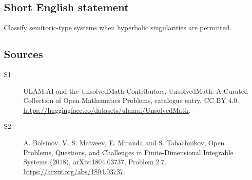 \documentclass[11pt]{article}
\begin{document}
\subsection{Short English statement}
Classify semitoric-type systems when hyperbolic singularities are permitted.
\subsection{Sources}
\begin{description}
\item[\hypertarget{source:statement:1}{S1}] ULAM.AI and the UnsolvedMath Contributors, UnsolvedMath: A Curated Collection of Open Mathematics Problems, catalogue entry. CC BY 4.0. \url{https://huggingface.co/datasets/ulamai/UnsolvedMath}.
\item[\hypertarget{source:statement:2}{S2}] A. Bolsinov, V. S. Matveev, E. Miranda and S. Tabachnikov, Open Problems, Questions, and Challenges in Finite-Dimensional Integrable Systems (2018), arXiv:1804.03737, Problem 2.7. \url{https://arxiv.org/abs/1804.03737}.
\end{description}
\label{end:statement}
\end{document}

